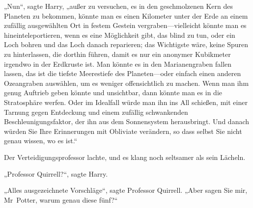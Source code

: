„Nun“, sagte Harry, „außer zu versuchen, es in den geschmolzenen Kern des Planeten zu bekommen, könnte man es einen Kilometer unter der Erde an einem zufällig ausgewählten Ort in festem Gestein vergraben—vielleicht könnte man es hineinteleportieren, wenn es eine Möglichkeit gibt, das blind zu tun, oder ein Loch bohren und das Loch danach reparieren; das Wichtigste wäre, keine Spuren zu hinterlassen, die dorthin führen, damit es nur ein anonymer Kubikmeter irgendwo in der Erdkruste ist. Man könnte es in den Marianengraben fallen lassen, das ist die tiefste Meerestiefe des Planeten—oder einfach einen anderen Ozeangraben auswählen, um es weniger offensichtlich zu machen. Wenn man ihm genug Auftrieb geben könnte und unsichtbar, dann könnte man es in die Stratosphäre werfen. Oder im Idealfall würde man ihn ins All schießen, mit einer Tarnung gegen Entdeckung und einem zufällig schwankenden Beschleunigungsfaktor, der ihn aus dem Sonnensystem herausbringt. Und danach würden Sie Ihre Erinnerungen mit Obliviate verändern, so dass selbst Sie nicht genau wissen, wo es ist.“

Der Verteidigungsprofessor lachte, und es klang noch seltsamer als sein Lächeln.

„Professor Quirrell?“, sagte Harry.

„Alles ausgezeichnete Vorschläge“, sagte Professor Quirrell. „Aber sagen Sie mir, Mr~Potter, warum genau diese fünf?“

